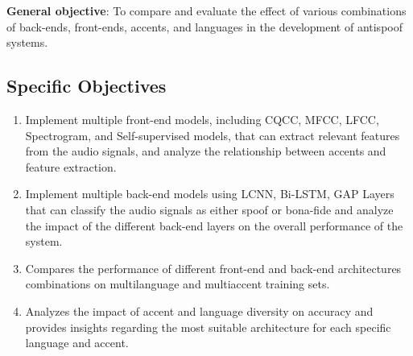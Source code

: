 \textbf{General objective}: To compare and evaluate the effect of various combinations of back-ends, front-ends, accents, and languages in the development of antispoof systems.





\subsection{Specific Objectives}

\begin{enumerate}
    \item Implement multiple front-end models, including \acs{CQCC}, \acs{MFCC}, \acs{LFCC}, Spectrogram, and Self-supervised models, that can extract relevant features from the audio signals, and analyze the relationship between accents and feature extraction.
    \item Implement multiple back-end models using \acs{LCNN}, \acs{Bi-LSTM}, \acs{GAP} Layers that can classify the audio signals as either spoof or bona-fide and analyze the impact of the different back-end layers on the overall performance of the system.
    \item Compares the performance of different front-end and back-end architectures combinations on multilanguage  and multiaccent training sets. 
    \item Analyzes the impact of accent and language diversity on accuracy and provides insights regarding the most suitable architecture for each specific language and accent.
\end{enumerate}




\endinput

